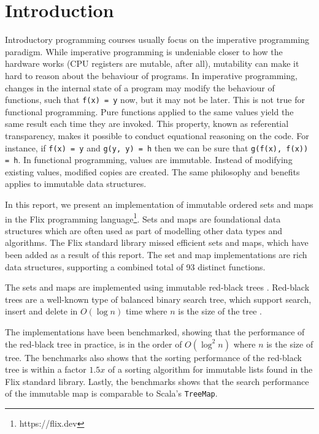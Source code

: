 \documentclass[../main.tex]{subfiles}
\begin{document}
\chapter{Introduction}

Introductory programming courses usually focus on the imperative programming paradigm. While imperative programming is undeniable closer to how the hardware works (CPU registers are mutable, after all), mutability can make it hard to reason about the behaviour of programs. In imperative programming, changes in the internal state of a program may modify the behaviour of functions, such that \lstinline{f(x) = y} now, but it may not be later. This is not true for functional programming. Pure functions applied to the same values yield the same result each time they are invoked. This property, known as referential transparency, makes it possible to conduct equational reasoning on the code. For instance, if \lstinline{f(x) = y} and \lstinline{g(y, y) = h} then we can be sure that \lstinline{g(f(x), f(x)) = h}. In functional programming, values are immutable. Instead of modifying existing values, modified copies are created. The same philosophy and benefits applies to immutable data structures.

In this report, we present an implementation of immutable ordered sets and maps in the Flix programming language\footnote{https://flix.dev}. Sets and maps are foundational data structures which are often used as part of modelling other data types and algorithms. The Flix standard library missed efficient sets and maps, which have been added as a result of this report. The set and map implementations are rich data structures, supporting a combined total of 93 distinct functions.

The sets and maps are implemented using immutable red-black trees \citep{okasaki-1998, germane-matthew-2014}. Red-black trees are a well-known type of balanced binary search tree, which support search, insert and delete in $O(\log{n})$ time where $n$ is the size of the tree \citep{cormen-et-al-2009}.

The implementations have been benchmarked, showing that the performance of the red-black tree in practice, is in the order of $O(\log^2{n})$ where $n$ is the size of tree. The benchmarks also shows that the sorting performance of the red-black tree is within a factor $1.5x$ of a sorting algorithm for immutable lists found in the Flix standard library. Lastly, the benchmarks shows that the search performance of the immutable map is comparable to Scala's \lstinline{TreeMap}.
\end{document}
